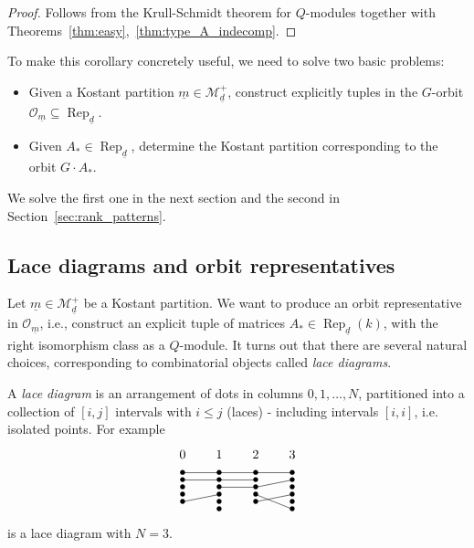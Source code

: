 \documentclass[a4paper]{amsart}
\DeclareMathOperator{\Rep}{\mathrm{Rep}}
\newcommand{\CO}{\mathcal{O}}
\newcommand{\CM}{\mathcal{M}}
\newcommand{\um}{\underline{m}}
\newcommand{\ud}{\underline{d}}
\theoremstyle{plain}
\begin{document}
\begin{proof} Follows from the Krull-Schmidt theorem for $Q$-modules together with Theorems~\ref{thm:easy},~\ref{thm:type_A_indecomp}.
\end{proof}

To make this corollary concretely useful, we need to solve two basic problems:
\begin{itemize}
    \item Given a Kostant partition $\um\in \CM^+_{\ud}$, construct explicitly tuples in the $G$-orbit $\CO_{\um}\subseteq \Rep_{\ud}$.
    \item Given $A_*\in \Rep_{\ud}$, determine the Kostant partition corresponding to the orbit $G\cdot A_*$.
\end{itemize}
We solve the first one in the next section and the second in Section~\ref{sec:rank_patterns}.

\subsection{Lace diagrams and orbit representatives}
\label{sec:laces}


 Let $\um\in \CM^+_{\ud}$ be a Kostant partition. We want to produce an orbit representative in $\CO_{\um}$, i.e., construct an explicit tuple of matrices $A_*\in\Rep_{\ud}(k)$, with the right isomorphism class as a $Q$-module. It turns out that there are several natural choices, corresponding to combinatorial objects called {\em lace diagrams}.

A {\em lace diagram} is an arrangement of dots in columns $0,1,\ldots,N$, partitioned into a collection of $[i,j]$ intervals with $i\leq j$ (laces) - including intervals $[i,i]$, i.e. isolated points. For example
\begin{equation}
\label{eq:lace_diagram_bad}
\begin{tikzpicture}[baseline=-12]
\node at (0,.5) {$0$};
\node at (1,.5) {$1$};
\node at (2,.5) {$2$};
\node at (3,.5) {$3$};
 \node at (0,0)  {$\bullet$};
 \node at (0,-.2)  {$\bullet$};
 \node at (0,-.4)  {$\bullet$};
 \node at (0,-.6)  {$\bullet$};
 \node at (0,-.8)  {$\bullet$};

 \node at (1,0)  {$\bullet$};
 \node at (1,-.2)  {$\bullet$};
 \node at (1,-.4)  {$\bullet$};
 \node at (1,-.6)  {$\bullet$};
 \node at (1,-.8)  {$\bullet$};
\node at (1,-1)  {$\bullet$};

 \node at (2,0)  {$\bullet$};
 \node at (2,-.2)  {$\bullet$};
 \node at (2,-.4)  {$\bullet$};
 \node at (2,-.6)  {$\bullet$};
 \node at (2,-.8)  {$\bullet$};

 \node at (3,0)  {$\bullet$};
 \node at (3,-.2)  {$\bullet$};
 \node at (3,-.4)  {$\bullet$};
 \node at (3,-.6)  {$\bullet$};
 \node at (3,-.8)  {$\bullet$};
 \node at (3,-1)  {$\bullet$};

\draw (0,0) -- (3,0);
\draw (0,-.2) -- (2,-.2);
\draw (1,-.4) -- (2,-.4) -- (3,-.2);
\draw (0,-.8) -- (1,-.6);
\draw (2,-.6) -- (3,-1.0);
\draw (2,-.8) -- (3,-.6);
\end{tikzpicture}
\end{equation}
is a lace diagram with $N=3$. 
\end{document}
